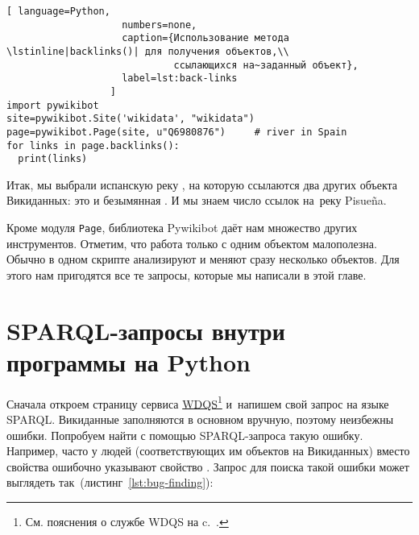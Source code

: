 \newpage
{}
\begin{lstlisting}[ language=Python,
                    numbers=none,
                    caption={Использование метода \lstinline|backlinks()| для получения объектов,\\
                             ссылающихся на~заданный объект},
                    label=lst:back-links
                  ]
import pywikibot
site=pywikibot.Site('wikidata', "wikidata")
page=pywikibot.Page(site, u"Q6980876")     # river in Spain
for links in page.backlinks():
  print(links)
\end{lstlisting}

Итак, мы выбрали испанскую реку , на которую ссылаются 
два других объекта Викиданных: это  и безымянная . 
И мы знаем число ссылок на~реку Pisueña. 


Кроме модуля \lstinline|Page|, 
библиотека Pywikibot даёт нам множество других инструментов. 
Отметим, что работа только с одним объектом малополезна. 
Обычно в одном скрипте анализируют и меняют сразу несколько объектов. 
Для этого нам пригодятся все те запросы, которые мы написали в этой главе.





\section{SPARQL-запросы внутри программы на Python}
\label{sec:running-queries}

Сначала откроем страницу сервиса \href{https://query.wikidata.org/}{WDQS}\footnote[][0pt]{%
%    
    См. пояснения о службе WDQS на c.~\pageref{sect:WDQS}.%
%    
}  и~напишем свой запрос на языке SPARQL. 
Викиданные заполняются в основном вручную, поэтому неизбежны ошибки. 
Попробуем найти с помощью SPARQL-запроса такую ошибку. 
Например, часто у людей (соответствующих им объектов на Викиданных) 
вместо свойства  
ошибочно указывают свойство . 
Запрос для поиска такой ошибки может выглядеть так~(листинг~\ref{lst:bug-finding}):

